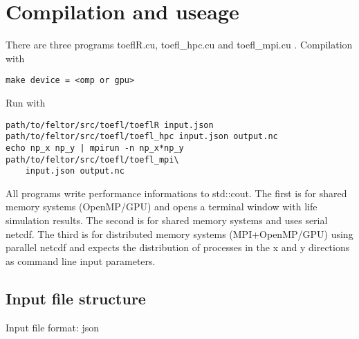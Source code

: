 \section{Compilation and useage}
There are three programs toeflR.cu, toefl\_hpc.cu and toefl\_mpi.cu . Compilation with 
\begin{verbatim}
make device = <omp or gpu>
\end{verbatim}
Run with
\begin{verbatim}
path/to/feltor/src/toefl/toeflR input.json
path/to/feltor/src/toefl/toefl_hpc input.json output.nc
echo np_x np_y | mpirun -n np_x*np_y path/to/feltor/src/toefl/toefl_mpi\
    input.json output.nc
\end{verbatim}
All programs write performance informations to std::cout.
The first is for shared memory systems (OpenMP/GPU) and opens a terminal window with life simulation results.
 The
second is for shared memory systems and uses serial netcdf.
The third is for distributed
memory systems (MPI+OpenMP/GPU) using parallel netcdf and expects the distribution of processes in the
x and y directions as command line input parameters.

\subsection{Input file structure}
Input file format: json

